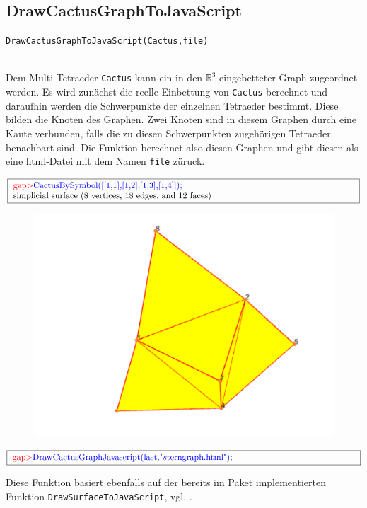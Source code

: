 \documentclass[12pt,titlepage,twoside,cleardoublepage]{article}
\theoremstyle{nummermitklammern}
\numberwithin{equation}{section}
\begin{document}
\subsection{DrawCactusGraphToJavaScript}
\begin{large}
\texttt{DrawCactusGraphToJavaScript(Cactus,file)}
\end{large}\\
Dem Multi-Tetraeder \texttt{Cactus} kann ein in den $\mathbb{R}^3$ eingebetteter Graph zugeordnet werden. Es wird zunächst die reelle Einbettung von \texttt{Cactus} berechnet und daraufhin werden die Schwerpunkte der einzelnen Tetraeder bestimmt. Diese bilden die Knoten des Graphen. Zwei Knoten sind in diesem Graphen durch eine Kante verbunden, falls die zu diesen Schwerpunkten zugehörigen Tetraeder benachbart sind.
Die Funktion berechnet also diesen Graphen und gibt diesen als eine html-Datei mit dem Namen \texttt{file} züruck.
\begin{center} 
$\fbox{
\parbox{14cm}{
\textcolor{red}{gap$>$}\textcolor{blue}{ CactusBySymbol([[1,1],[1,2],[1,3],[1,4]]);}\newline
simplicial surface (8 vertices, 18 edges, and 12 faces)
}}$
 \begin{figure}[H]
\begin{center}
\includegraphics[scale=0.5,viewport=0cm 1.5cm 18cm 13cm]{stern2}
\end{center}
\end{figure}
$\fbox{
\parbox{14cm}{
\textcolor{red}{gap$>$}\textcolor{blue}{DrawCactusGraphJavascript(last,"$s$terngraph.html")};
}
}$
\end{center}
Diese Funktion basiert ebenfalls auf der bereits im Paket implementierten Funktion \texttt{DrawSurfaceToJavaScript}, vgl. \cite{gapsimp}.
\end{document}
